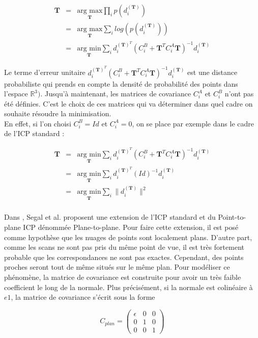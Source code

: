 \begin{eqnarray}
\mathbf{T} &=& \underset{\mathbf{T}}{\text{arg max}} \prod_{i} p(d_{i}^{(\mathbf{T})}) \\
&=& \underset{\mathbf{T}}{\text{arg max}} \sum_{i} log(p(d_{i}^{(\mathbf{T})})) \\
&=& \underset{\mathbf{T}}{\text{arg min}} \sum_{i} d_{i}^{(\mathbf{T})^T}(C_{i}^B + \mathbf{T}^{T}C_{i}^{A}\mathbf{T})^{-1}d_{i}^{(\mathbf{T})}
\end{eqnarray}

Le terme d'erreur unitaire $d_{i}^{(\mathbf{T})^T}(C_{i}^B+\mathbf{T}^{T}C_{i}^{A}\mathbf{T})^{-1}d_{i}^{(\mathbf{T})}$  est une distance probabiliste qui prends en compte la densité de probabilité des points dans l'espace $\mathbb{R}^{3})$. Jusqu'à maintenant, les matrices de covariance $C_{i}^A$ et $C_{i}^B$ n'ont pas été définies. C'est le choix de ces matrices qui va déterminer dans quel cadre on souhaite résoudre la minimisation.\\

En effet, si l'on choisi $C_{i}^B = Id$ et $C_{i}^A = 0$, on se place par exemple dans le cadre de l'ICP standard :

\begin{eqnarray}
\mathbf{T} &=& \underset{\mathbf{T}}{\text{arg min}} \sum_{i} d_{i}^{(\mathbf{T})^T}(C_{i}^B + \mathbf{T}^{T}C_{i}^{A}\mathbf{T})^{-1}d_{i}^{(\mathbf{T})}\\
&=& \underset{\mathbf{T}}{\text{arg min}} \sum_{i} d_{i}^{(\mathbf{T})^T}(Id)^{-1}d_{i}^{(\mathbf{T})}\\
&=& \underset{\mathbf{T}}{\text{arg min}} \sum_{i} \|d_{i}^{(\mathbf{T})}\|^2\\
\end{eqnarray}

Dans \cite{bib_gicp}, Segal et al. proposent une extension de l'ICP standard et du Point-to-plane ICP  dénommée Plane-to-plane. Pour faire cette extension, il est posé comme hypothèse que les nuages de points sont localement plans. D'autre part, comme les scans ne sont pas pris du même point de vue, il est très fortement probable que les correspondances ne sont pas exactes. Cependant, des points proches seront tout de même situés sur le même plan. Pour modéliser ce phénomène, la matrice de covariance est construite pour avoir un très faible coefficient le long de la normale. Plus précisément, si la normale est colinéaire à $e1$, la matrice de covariance s'écrit sous la forme 

\begin{equation}C_{plan} = \begin{pmatrix} 
 \epsilon & 0 & 0 \\
 0 & 1 & 0 \\ 
 0 & 0 & 1 
 \end{pmatrix}
\end{equation}


